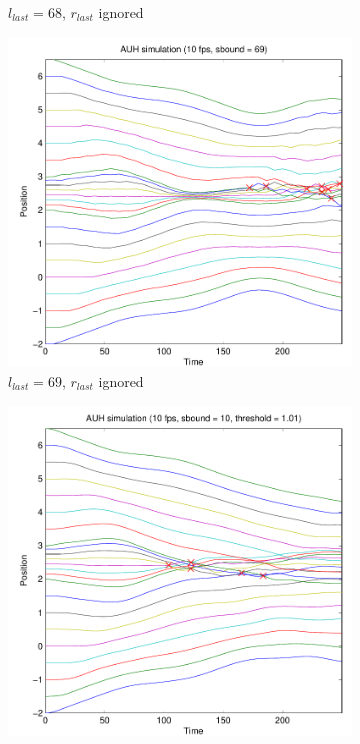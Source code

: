 \documentclass[11pt]{article}
\begin{document}
\begin{figure}[H]
\begin{subfigure}[t]{0.5\textwidth}
        \caption{$l_{last} = 68$, $r_{last}$ ignored}
        \label{fig:atomic_multi_68sbound}
    \end{subfigure}
    \begin{subfigure}[t]{0.5\textwidth}
        \includegraphics[width=\textwidth]{../images/atomic_multiscale_10fps_69sbound.pdf}
        \caption{$l_{last} = 69$, $r_{last}$ ignored}
        \label{fig:atomic_multi_69sbound}
    \end{subfigure}
    \begin{subfigure}[t]{0.5\textwidth}
        \includegraphics[width=\textwidth]{../images/atomic_multiscale_10fps_both.pdf}

\end{subfigure}
\end{figure}
\end{document}
